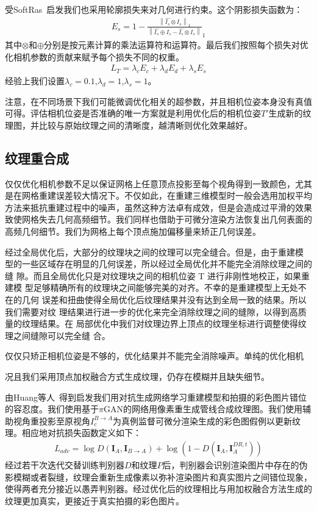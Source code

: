 受SoftRas~\cite{ShichenLiu2019SoftRA}启发我们也采用轮廓损失来对几何进行约束。这个阴影损失函数为：
\begin{align}
	E_s = 1 - \frac{\left \| \hat{I_s}\otimes I_s  \right \|_1 }{\left \| \hat{I_s}\oplus  I_s- \hat{I_s}\otimes I_s \right \| }_1  
\end{align}
其中$\otimes $和$\oplus $分别是按元素计算的乘法运算符和运算符。最后我们按照每个损失对优化相机参数的贡献来赋予每个损失不同的权重。
\begin{align}
	L_T = \lambda_c E_c + \lambda_d E_d +\lambda_s E_s
\end{align}经验上我们设置$\lambda_c = 0.1$,$\lambda_d = 1$,$\lambda_s = 1$。\par
注意，在不同场景下我们可能微调优化相关的超参数，并且相机位姿本身没有真值可得。评估相机位姿是否准确的唯一方案就是利用优化后的相机位姿$T'$生成新的纹理图，并比较与原始纹理之间的清晰度，越清晰则优化效果越好。

\subsection{纹理重合成}
仅仅优化相机参数不足以保证网格上任意顶点投影至每个视角得到一致颜色，尤其是在网格重建误差较大情况下。不仅如此，在重建三维模型时一般会选用加权平均方法来抵抗重建过程中的噪声，虽然这种方法卓有成效，但是会造成过平滑的效果致使网格失去几何高频细节。我们同样也借助于可微分渲染方法恢复出几何表面的高频几何细节。我们为网格上每个顶点施加偏移量来矫正几何误差。\par

经过全局优化后，大部分的纹理块之间的纹理可以完全缝合。但是，由于重建模 型的一些区域存在明显的几何误差，所以经过全局优化并不能完全消除纹理之间的缝 隙。而且全局优化只是对纹理块之间的相机位姿 T 进行非刚性地校正，如果重建模 型足够精确所有的纹理块之间能够完美的对齐。不幸的是重建模型上无处不在的几何 误差和扭曲使得全局优化后纹理结果并没有达到全局一致的结果。所以我们需要对纹 理结果进行进一步的优化来完全消除纹理之间的缝隙，以得到高质量的纹理结果。在 局部优化中我们对纹理边界上顶点的纹理坐标进行调整使得纹理之间缝隙可以完全缝 合。

仅仅只矫正相机位姿是不够的，优化结果并不能完全消除噪声。单纯的优化相机

况且我们采用顶点加权融合方式生成纹理，仍存在模糊并且缺失细节。


由Huang等人~\cite{JingweiHuang2020AdversarialTO}得到启发我们用对抗生成网络学习重建模型和拍摄的彩色图片错位的容忍度。我们使用基于$\pi$GAN\cite{chanmonteiro2020pi-GAN}的网络用像素重生成管线合成纹理图。我们使用辅助视角重投影至原视角$I_c^{B\to A}$为真例监督可微分渲染生成的彩色图假例以更新纹理。相应地对抗损失函数定义如下：
\begin{align}
	L_{a d v}=\log D\left(\boldsymbol{I}_{A}, \boldsymbol{I}_{B \rightarrow A}\right)+\log \left(1-D\left(\boldsymbol{I}_{A}, \boldsymbol{I}_{A}^{D R, t}\right)\right) 
\end{align}
经过若干次迭代交替训练判别器$D$和纹理$P$后，判别器会识别渲染图片中存在的伪影模糊或者裂缝，纹理会重新生成像素以弥补渲染图片和真实图片之间错位现象，使得两者充分接近以愚弄判别器。经过优化后的纹理相比与用加权融合方法生成的纹理更加真实，更接近于真实拍摄的彩色图片。
